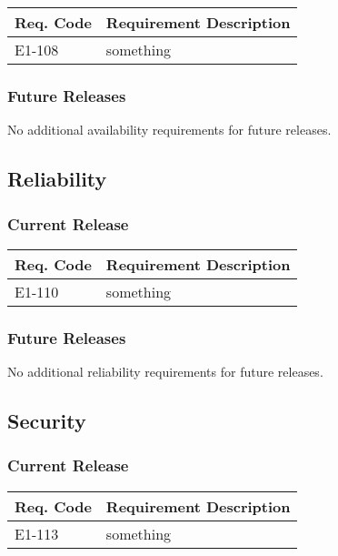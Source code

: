 \documentclass[12pt]{article}
\begin{document}
\begin{table}[!h]
	\begin{tabular}{| l | l |}
		\hline
		\textbf{Req. Code} & \textbf{Requirement Description}\\
		\hline
		E1-108	& something\\
		\hline
	\end{tabular}
	\label{tab:AvailabilityRequirements}
\end{table}

\subsubsection{Future Releases}
No additional availability requirements for future releases.


\subsection{Reliability}

\subsubsection{Current Release}

\begin{table}[!h]
	\begin{tabular}{| l | l|}
		\hline
		\textbf{Req. Code} & \textbf{Requirement Description}\\
		\hline
		E1-110	& something\\
		\hline
	\end{tabular}
	\label{tab:ReliabilityRequirements}
\end{table}

\subsubsection{Future Releases}
No additional reliability requirements for future releases.


\subsection{Security}

\subsubsection{Current Release}

\begin{table}[!h]
	\begin{tabular}{| l | l |}
		\hline
		\textbf{Req. Code} & \textbf{Requirement Description}\\
		\hline
		E1-113	& something\\
		\hline
	\end{tabular}
	\label{tab:SecurityRequirements}
\end{table}
\end{document}
